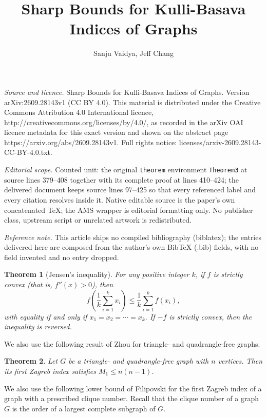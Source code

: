 \documentclass[10pt,a4paper]{amsart}
\newtheorem{theorem}{Theorem}[section]
\numberwithin{equation}{section}
\begin{document}
\title[Sharp Bounds for Kulli-Basava Indices of Graphs]{Sharp Bounds for Kulli-Basava Indices of Graphs}
\author{Sanju Vaidya, Jeff Chang}
\date{}
\maketitle
\noindent\emph{Source and licence.} Sharp Bounds for Kulli-Basava Indices of Graphs. Version arXiv:2609.28143v1 (CC BY 4.0). This material is distributed under the Creative Commons Attribution 4.0 International licence, http://creativecommons.org/licenses/by/4.0/, as recorded in the arXiv OAI licence metadata for this exact version and shown on the abstract page https://arxiv.org/abs/2609.28143v1. Full rights notice: licenses/arxiv-2609.28143-CC-BY-4.0.txt.\par\smallskip
\noindent\textit{Editorial scope.} Counted unit: the original \texttt{theorem} environment \texttt{Theorem3} at source lines 379--408 together with its complete proof at lines 410--424; the delivered document keeps source lines 97--425 so that every referenced label and every citation resolves inside it. Native editable source is the paper's own concatenated TeX; the AMS wrapper is editorial formatting only. No publisher class, upstream script or unrelated artwork is redistributed.\par\smallskip\noindent\textit{Reference note.} This article ships no compiled bibliography (biblatex); the entries delivered here are composed from the author's own BibTeX (.bib) fields, with no field invented and no entry dropped.
\begin{theorem}[Jensen's inequality]\label{Jensen}
For any positive integer $k$, if $f$ is strictly convex (that is, $f''(x)>0$), then
\[
f\left(\frac{1}{k}\sum_{i=1}^{k}x_i\right)\leq \frac{1}{k}\sum_{i=1}^{k}f(x_i),
\]
with equality if and only if $x_1=x_2=\cdots=x_k$. If $-f$ is strictly convex, then the inequality is reversed.
\end{theorem}


We also use the following result of Zhou \cite{zhou2006note} for triangle- and quadrangle-free graphs.

\begin{theorem}
Let $G$ be a triangle- and quadrangle-free graph with $n$ vertices. Then its first Zagreb index satisfies $M_1\leq n(n-1)$.
\end{theorem}

We also use the following lower bound of Filipovski \cite{filipovski2021new} for the first Zagreb index of a graph with a prescribed clique number. Recall that the clique number of a graph $G$ is the order of a largest complete subgraph of $G$.
\end{document}
